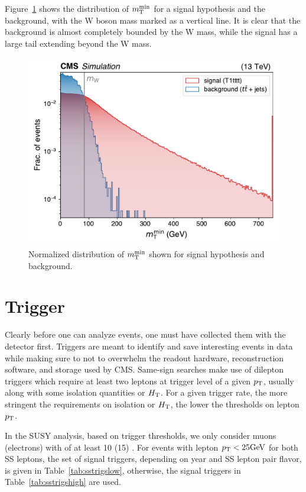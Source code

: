 Figure~\ref{fig:mtminttbar} shows the distribution of $m_{\mathrm{T}}^{\text{min}}$ for a signal hypothesis \Totttt and the
\ttbar background, with the W boson mass marked as a vertical line. It is clear that 
the \ttbar background is almost completely bounded by the W mass, while the signal has a
large tail extending beyond the W mass.

\begin{figure}[!hbtp]
\centering
\includegraphics[width=.70\textwidth]{figs/misc/mtmin_signal_ttbar.pdf}
\caption{
    Normalized distribution of $m_{\mathrm{T}}^{\text{min}}$ shown for signal hypothesis \Totttt and 
    \ttbar background.
}
\label{fig:mtminttbar}
\end{figure}

\section{Trigger}

Clearly before one can analyze events, one must have collected them with the detector first.
Triggers are meant to identify and save interesting events in data while making sure to not to overwhelm
the readout hardware, reconstruction software, and storage used by CMS. 
Same-sign searches make use of dilepton triggers
which require at least two leptons at trigger level of a given $p_{\mathrm{T}}$, usually along with some
isolation quantities or $H_{\mathrm{T}}$. For a given trigger rate, 
the more stringent the requirements on isolation or $H_{\mathrm{T}}$, the
lower the thresholds on lepton $p_{\mathrm{T}}$.

In the SUSY analysis, based on trigger thresholds, 
we only consider muons (electrons) with \pt of at least 10 (15) \GeV.
For events with lepton $p_{\mathrm{T}} < 25\text{GeV}$ for both SS leptons, the set of signal triggers, depending on year
and SS lepton pair flavor, is given in Table~\ref{tab:sstrigslow}, otherwise, the signal triggers in 
Table~\ref{tab:sstrigshigh} are used.

